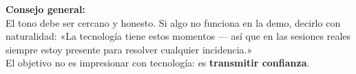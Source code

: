 \documentclass[11pt, a4paper]{article}
\begin{document}
\vspace{12pt}
\begin{nota}
\textbf{Consejo general:}\\
El tono debe ser cercano y honesto. Si algo no funciona en la demo, decirlo con
naturalidad: «La tecnología tiene estos momentos — así que en las sesiones reales
siempre estoy presente para resolver cualquier incidencia.»\\[4pt]
El objetivo no es impresionar con tecnología: es \textbf{transmitir confianza}.
\end{nota}
\end{document}
